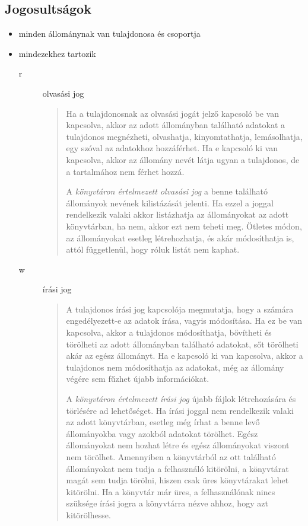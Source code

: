 
\subsection{Jogosultságok}

\begin{itemize}
\item minden állománynak van tulajdonosa és csoportja 
\item mindezekhez tartozik 
	\begin{description}
	\item[r] olvasási jog

\begin{quotation}
\small		
	Ha a tulajdonosnak az olvasási jogát jelző kapcsoló be van kapcsolva, akkor az adott állományban található adatokat a tulajdonos megnézheti, olvashatja, kinyomtathatja, lemásolhatja, egy szóval az adatokhoz hozzáférhet. Ha e kapcsoló ki van kapcsolva, akkor az állomány nevét látja ugyan a tulajdonos, de a tartalmához nem férhet hozzá.


A \textit{könyvtáron értelmezett olvasási jog} a benne található állományok nevének kilistázását jelenti. Ha ezzel a joggal rendelkezik valaki akkor listázhatja az állományokat az adott könyvtárban, ha nem, akkor ezt nem teheti meg. Ötletes módon, az állományokat esetleg létrehozhatja, és akár módosíthatja is, attól függetlenül, hogy róluk listát nem kaphat.
\end{quotation}

	\item[w] írási jog

\begin{quotation}
\small	
	A tulajdonos írási jog kapcsolója megmutatja, hogy a számára engedélyezett-e az adatok írása, vagyis módosítása. Ha ez be van kapcsolva, akkor a tulajdonos módosíthatja, bővítheti és törölheti az adott állományban található adatokat, sőt törölheti akár az egész állományt. Ha e kapcsoló ki van kapcsolva, akkor a tulajdonos nem módosíthatja az adatokat, még az állomány végére sem fűzhet újabb információkat.
	
A \textit{könyvtáron értelmezett írási jog} újabb fájlok létrehozására és törlésére ad lehetőséget. Ha írási joggal nem rendelkezik valaki az adott könyvtárban, esetleg még írhat a benne levő állományokba vagy azokból adatokat törölhet. Egész állományokat nem hozhat létre és egész állományokat viszont nem törölhet. Amennyiben a könyvtárból az ott található állományokat nem tudja a felhasználó kitörölni, a könyvtárat magát sem tudja törölni, hiszen csak üres könyvtárakat lehet kitörölni. Ha a könyvtár már üres, a felhasználónak nincs szüksége írási jogra a könyvtárra nézve ahhoz, hogy azt kitörölhesse.
\end{quotation}



\end{description}
\end{itemize}
